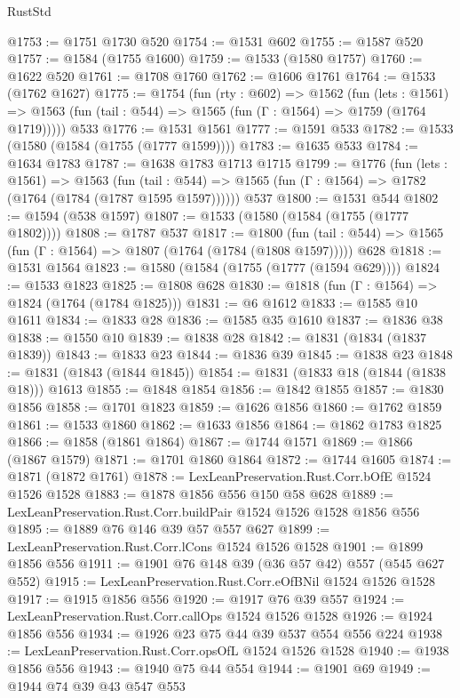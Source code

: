 \begin{lexlean}{RustStd}
\begin{coremodule}
@1753 := @1751 @1730 @520
@1754 := @1531 @602
@1755 := @1587 @520
@1757 := @1584 (@1755 @1600)
@1759 := @1533 (@1580 @1757)
@1760 := @1622 @520
@1761 := @1708 @1760
@1762 := @1606 @1761
@1764 := @1533 (@1762 @1627)
@1775 := @1754
    (fun (rty : @602) =>
    @1562
      (fun (lets : @1561) =>
      @1563 (fun (tail : @544) => @1565 (fun (Γ : @1564) => @1759 (@1764 @1719)))))
    @533
@1776 := @1531 @1561
@1777 := @1591 @533
@1782 := @1533 (@1580 (@1584 (@1755 (@1777 @1599))))
@1783 := @1635 @533
@1784 := @1634 @1783
@1787 := @1638 @1783 @1713 @1715
@1799 := @1776
    (fun (lets : @1561) =>
    @1563
      (fun (tail : @544) => @1565 (fun (Γ : @1564) => @1782 (@1764 (@1784 (@1787 @1595 @1597))))))
    @537
@1800 := @1531 @544
@1802 := @1594 (@538 @1597)
@1807 := @1533 (@1580 (@1584 (@1755 (@1777 @1802))))
@1808 := @1787 @537
@1817 := @1800
    (fun (tail : @544) => @1565 (fun (Γ : @1564) => @1807 (@1764 (@1784 (@1808 @1597)))))
    @628
@1818 := @1531 @1564
@1823 := @1580 (@1584 (@1755 (@1777 (@1594 @629))))
@1824 := @1533 @1823
@1825 := @1808 @628
@1830 := @1818 (fun (Γ : @1564) => @1824 (@1764 (@1784 @1825)))
@1831 := @6 @1612
@1833 := @1585 @10 @1611
@1834 := @1833 @28
@1836 := @1585 @35 @1610
@1837 := @1836 @38
@1838 := @1550 @10
@1839 := @1838 @28
@1842 := @1831 (@1834 (@1837 @1839))
@1843 := @1833 @23
@1844 := @1836 @39
@1845 := @1838 @23
@1848 := @1831 (@1843 (@1844 @1845))
@1854 := @1831 (@1833 @18 (@1844 (@1838 @18))) @1613
@1855 := @1848 @1854
@1856 := @1842 @1855
@1857 := @1830 @1856
@1858 := @1701 @1823
@1859 := @1626 @1856
@1860 := @1762 @1859
@1861 := @1533 @1860
@1862 := @1633 @1856
@1864 := @1862 @1783 @1825
@1866 := @1858 (@1861 @1864)
@1867 := @1744 @1571
@1869 := @1866 (@1867 @1579)
@1871 := @1701 @1860 @1864
@1872 := @1744 @1605
@1874 := @1871 (@1872 @1761)
@1878 := LexLeanPreservation.Rust.Corr.bOfE @1524 @1526 @1528
@1883 := @1878 @1856 @556 @150 @58 @628
@1889 := LexLeanPreservation.Rust.Corr.buildPair @1524 @1526 @1528 @1856 @556
@1895 := @1889 @76 @146 @39 @57 @557 @627
@1899 := LexLeanPreservation.Rust.Corr.lCons @1524 @1526 @1528
@1901 := @1899 @1856 @556
@1911 := @1901 @76 @148 @39 (@36 @57 @42) @557 (@545 @627 @552)
@1915 := LexLeanPreservation.Rust.Corr.eOfBNil @1524 @1526 @1528
@1917 := @1915 @1856 @556
@1920 := @1917 @76 @39 @557
@1924 := LexLeanPreservation.Rust.Corr.callOps @1524 @1526 @1528
@1926 := @1924 @1856 @556
@1934 := @1926 @23 @75 @44 @39 @537 @554 @556 @224
@1938 := LexLeanPreservation.Rust.Corr.opsOfL @1524 @1526 @1528
@1940 := @1938 @1856 @556
@1943 := @1940 @75 @44 @554
@1944 := @1901 @69
@1949 := @1944 @74 @39 @43 @547 @553

\end{coremodule}
\end{lexlean}
